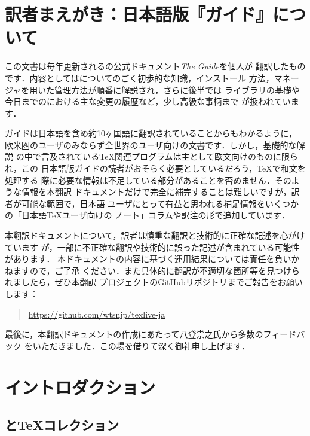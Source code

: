 \documentclass[uplatex,dvipdfmx,tombow]{jsarticle}
\date{2020年2月}
\begin{document}
\maketitle
\thispagestyle{empty}

\tableofcontents

\section*{訳者まえがき：日本語版『\TL ガイド』について}

この文書は毎年更新される\TL の公式ドキュメント\textsl{The {\TL} Guide}を個人が
翻訳したものです．内容としては\TL についてのごく初歩的な知識，インストール
方法，\TL マネージャを用いた\TL 管理方法が順番に解説され，さらに後半では\KPS
ライブラリの基礎や今日までの\TL における主な変更の履歴など，少し高級な事柄まで
が扱われています．

\TL ガイドは日本語を含め約10ヶ国語に翻訳されていることからもわかるように，
欧米圏のユーザのみならず全世界の\TL ユーザ向けの文書です．しかし，基礎的な解説
の中で言及されている\TeX 関連プログラムは主として欧文向けのものに限られ，この
日本語版\TL ガイドの読者がおそらく必要としているだろう，\TeX で和文を処理する
際に必要な情報は不足している部分があることを否めません．そのような情報を本翻訳
ドキュメントだけで完全に補完することは難しいですが，訳者が可能な範囲で，日本語
ユーザにとって有益と思われる補足情報をいくつかの「日本語\TeX ユーザ向けの
ノート」コラムや訳注の形で追加しています．

本翻訳ドキュメントについて，訳者は慎重な翻訳と技術的に正確な記述を心がけています
が，一部に不正確な翻訳や技術的に誤った記述が含まれている可能性があります．
本ドキュメントの内容に基づく運用結果については責任を負いかねますので，ご了承
ください．また具体的に翻訳が不適切な箇所等を見つけられましたら，ぜひ本翻訳
プロジェクトのGitHubリポジトリまでご報告をお願いします：
%
\begin{quote}
\url{https://github.com/wtsnjp/texlive-ja}
\end{quote}

最後に，本翻訳ドキュメントの作成にあたって八登祟之氏から多数のフィードバック
をいただきました．この場を借りて深く御礼申し上げます．

\section{イントロダクション}\label{sec:intro}

\subsection{\TL と\TeX コレクション}
\end{document}
